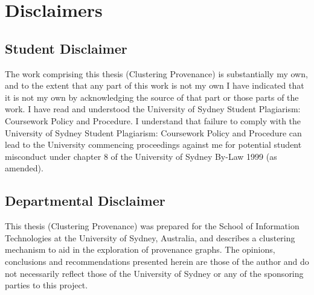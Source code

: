 \chapter{Disclaimers}
\section{Student Disclaimer}
The work comprising this thesis (Clustering Provenance) is substantially my own, and to the extent that any part of this
work is not my own I have indicated that it is not my own by acknowledging the source of that part or those parts
of the work. I have read and understood the University of Sydney Student Plagiarism: Coursework Policy and
Procedure. I understand that failure to comply with the University of Sydney Student Plagiarism: Coursework
Policy and Procedure can lead to the University commencing proceedings against me for potential student
misconduct under chapter 8 of the University of Sydney By-Law 1999 (as amended).

\section{Departmental Disclaimer}
This thesis (Clustering Provenance) was prepared for the School of Information Technologies at the University of Sydney,
Australia, and describes a clustering mechanism to aid in the exploration of provenance graphs. The opinions, conclusions and
recommendations presented herein are those of the author and do not necessarily reflect those of the
University of Sydney or any of the sponsoring parties to this project.
